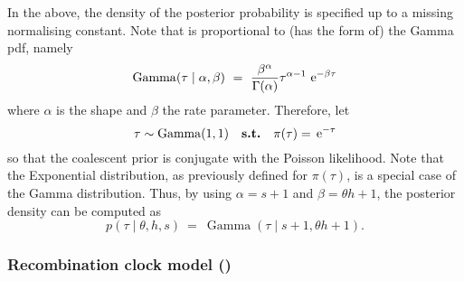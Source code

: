 In the above, the density of the posterior probability is specified up to a missing normalising constant.
Note that  is proportional to (has the form of) the Gamma \gls{pdf}, namely
\begin{equation*}
	\operatorname{Gamma}(\tau\mid\alpha,\beta)~=~\frac{\beta^\alpha}{\Gamma(\alpha)}\tau^{\alpha - 1}\,\,\mathrm{e}^{-\beta\tau}
\end{equation*}
where $\alpha$ is the shape and $\beta$ the rate parameter.
Therefore, let
\begin{equation*}
	\tau\sim\operatorname{Gamma}(1,1) \quad \textbf{s.t.} \quad \pi(\tau)=\,\mathrm{e}^{-\tau}
\end{equation*}
so that the coalescent prior is conjugate with the Poisson likelihood.
Note that the Exponential distribution, as previously defined for $\pi(\tau)$, is a special case of the Gamma distribution.
Thus, by using ${\alpha = s+1}$ and ${\beta = \theta h+1}$, the posterior density can be computed as
\begin{equation}
	p(\tau \mid \theta,h,s)~=~\operatorname{Gamma}(\tau\mid s+1, \theta h+1)\text{.}
\end{equation}




%
\subsubsection{Recombination clock model (\ClockR)}\label{sec:rec_clock}
%


